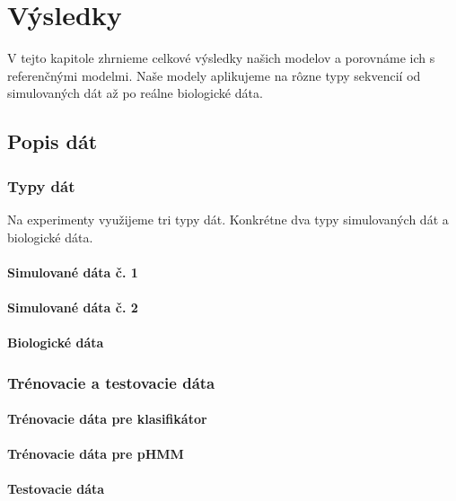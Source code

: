 \chapter{Výsledky}

V tejto kapitole zhrnieme celkové výsledky našich modelov a porovnáme ich s referenčnými modelmi. Naše modely aplikujeme na rôzne typy sekvencií od simulovaných dát až po reálne biologické dáta.

\section{Popis dát}

\subsection{Typy dát}
Na experimenty využijeme tri typy dát. Konkrétne dva typy simulovaných dát a biologické dáta.

\subsubsection{Simulované dáta č. 1}

\subsubsection{Simulované dáta č. 2}

\subsubsection{Biologické dáta}

\subsection{Trénovacie a testovacie dáta}

\subsubsection{Trénovacie dáta pre klasifikátor}

\subsubsection{Trénovacie dáta pre pHMM}

\subsubsection{Testovacie dáta}

